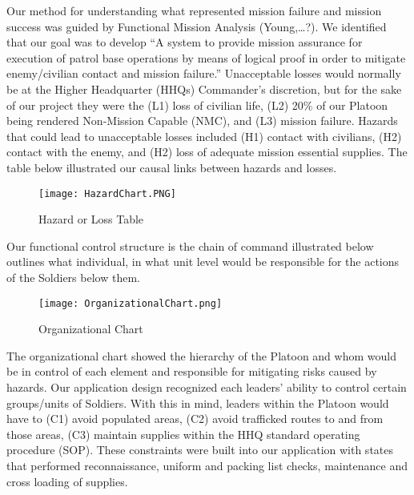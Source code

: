 Our method for understanding what represented mission failure and mission success was guided by Functional
Mission Analysis (Young,…?). We identified that our goal was to develop “A system to provide mission
assurance for execution of patrol base operations by means of logical proof in order to mitigate
enemy/civilian contact and mission failure.” Unacceptable losses would normally be at the Higher
Headquarter (HHQs) Commander’s discretion, but for the sake of our project they were the (L1) loss
of civilian life, (L2) 20\% of our Platoon being rendered Non-Mission Capable (NMC), and (L3) mission
failure. Hazards that could lead to unacceptable losses included (H1) contact with civilians, (H2)
contact with the enemy, and (H2) loss of adequate mission essential supplies. The table below
illustrated our causal links between hazards and losses.\\

\begin{figure}[h]               
  \centering
  \texttt{[image: HazardChart.PNG]}
  \caption{Hazard or Loss Table}
\end{figure}

Our functional control structure is the chain of command illustrated below outlines what individual,
in what unit level would be responsible for the actions of the Soldiers below them.\\

\begin{figure}[h]
  \centering
  \texttt{[image: OrganizationalChart.png]}
  \caption{Organizational Chart}
\end{figure}

The organizational chart showed the hierarchy of the Platoon and whom would be in control of
each element and responsible for mitigating risks caused by hazards. Our application design
recognized each leaders’ ability to control certain groups/units of Soldiers. With this in
mind, leaders within the Platoon would have to (C1) avoid populated areas, (C2) avoid trafficked
routes to and from those areas, (C3) maintain supplies within the HHQ standard operating
procedure (SOP). These constraints were built into our application with states that performed
reconnaissance, uniform and packing list checks, maintenance and cross loading of supplies.\\

